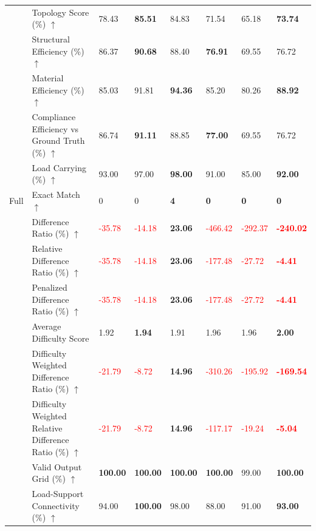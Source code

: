 \begin{table}[!h]
{\begin{tabular}{lllll|lll}
 & Topology Score (\%) $\uparrow$ & 78.43 & \textbf{85.51} & 84.83 & 71.54 & 65.18 & \textbf{73.74} \\
 & Structural Efficiency (\%) $\uparrow$ & 86.37 & \textbf{90.68} & 88.40 & \textbf{76.91} & 69.55 & 76.72 \\
 & Material Efficiency (\%) $\uparrow$ & 85.03 & 91.81 & \textbf{94.36} & 85.20 & 80.26 & \textbf{88.92} \\
 & Compliance Efficiency vs Ground Truth (\%) $\uparrow$ & 86.74 & \textbf{91.11} & 88.85 & \textbf{77.00} & 69.55 & 76.72 \\
 & Load Carrying (\%) $\uparrow$ & 93.00 & 97.00 & \textbf{98.00} & 91.00 & 85.00 & \textbf{92.00} \\
\midrule
Full & Exact Match $\uparrow$ & 0 & 0 & \textbf{4} & \textbf{0} & \textbf{0} & \textbf{0} \\
 & Difference Ratio (\%) $\uparrow$ & \textcolor{red}{-35.78} & \textcolor{red}{-14.18} & \textbf{23.06} & \textcolor{red}{-466.42} & \textcolor{red}{-292.37} & \textbf{\textcolor{red}{-240.02}} \\
 & Relative Difference Ratio (\%) $\uparrow$ & \textcolor{red}{-35.78} & \textcolor{red}{-14.18} & \textbf{23.06} & \textcolor{red}{-177.48} & \textcolor{red}{-27.72} & \textbf{\textcolor{red}{-4.41}} \\
 & Penalized Difference Ratio (\%) $\uparrow$ & \textcolor{red}{-35.78} & \textcolor{red}{-14.18} & \textbf{23.06} & \textcolor{red}{-177.48} & \textcolor{red}{-27.72} & \textbf{\textcolor{red}{-4.41}} \\
 & Average Difficulty Score & 1.92 & \textbf{1.94} & 1.91 & 1.96 & 1.96 & \textbf{2.00} \\
 & Difficulty Weighted Difference Ratio (\%) $\uparrow$ & \textcolor{red}{-21.79} & \textcolor{red}{-8.72} & \textbf{14.96} & \textcolor{red}{-310.26} & \textcolor{red}{-195.92} & \textbf{\textcolor{red}{-169.54}} \\
 & Difficulty Weighted Relative Difference Ratio (\%) $\uparrow$ & \textcolor{red}{-21.79} & \textcolor{red}{-8.72} & \textbf{14.96} & \textcolor{red}{-117.17} & \textcolor{red}{-19.24} & \textbf{\textcolor{red}{-5.04}} \\
 & Valid Output Grid (\%) $\uparrow$ & \textbf{100.00} & \textbf{100.00} & \textbf{100.00} & \textbf{100.00} & 99.00 & \textbf{100.00} \\
 & Load-Support Connectivity (\%) $\uparrow$ & 94.00 & \textbf{100.00} & 98.00 & 88.00 & 91.00 & \textbf{93.00} \\

\end{tabular}}
\end{table}
